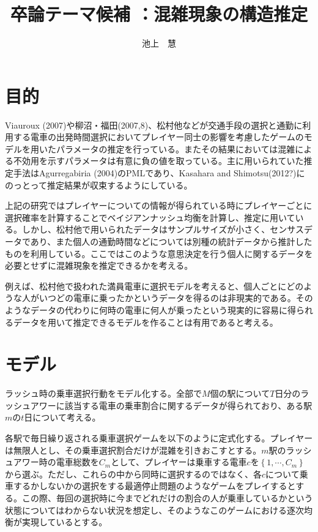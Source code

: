 \documentclass{jsarticle}
\begin{document}
\title{卒論テーマ候補 ：混雑現象の構造推定}
\author{池上　慧}
\maketitle

\section{目的}
Viauroux (2007)や柳沼・福田(2007,8)、松村他などが交通手段の選択と通勤に利用する電車の出発時間選択においてプレイヤー同士の影響を考慮したゲームのモデルを用いたパラメータの推定を行っている。またその結果においては混雑による不効用を示すパラメータは有意に負の値を取っている。主に用いられていた推定手法はAgurregabiria (2004)のPMLであり、Kasahara and Shimotsu(2012?)にのっとって推定結果が収束するようにしている。

上記の研究ではプレイヤーについての情報が得られている時にプレイヤーごとに選択確率を計算することでベイジアンナッシュ均衡を計算し、推定に用いている。しかし、松村他で用いられたデータはサンプルサイズが小さく、センサスデータであり、また個人の通勤時間などについては別種の統計データから推計したものを利用している。ここではこのような意思決定を行う個人に関するデータを必要とせずに混雑現象を推定できるかを考える。

例えば、松村他で扱われた満員電車に選択モデルを考えると、個人ごとにどのような人がいつどの電車に乗ったかというデータを得るのは非現実的である。そのようなデータの代わりに何時の電車に何人が乗ったという現実的に容易に得られるデータを用いて推定できるモデルを作ることは有用であると考える。

\section{モデル}
ラッシュ時の乗車選択行動をモデル化する。全部で$M$個の駅について$T$日分のラッシュアワーに該当する電車の乗車割合に関するデータが得られており、ある駅$m$の$t$日について考える。

各駅で毎日繰り返される乗車選択ゲームを以下のように定式化する。プレイヤーは無限人とし、その乗車選択割合だけが混雑を引きおこすとする。$m$駅のラッシュアワー時の電車総数を$C_m$として、プレイヤーは乗車する電車$c$を$\left\{ 1, \cdots, C_m\right\}$から選ぶ。ただし、これらの中から同時に選択するのではなく、各$c$について乗車するかしないかの選択をする最適停止問題のようなゲームをプレイするとする。この際、毎回の選択時に今までどれだけの割合の人が乗車しているかという状態についてはわからない状況を想定し、そのようなこのゲームにおける逐次均衡が実現しているとする。
\end{document}
